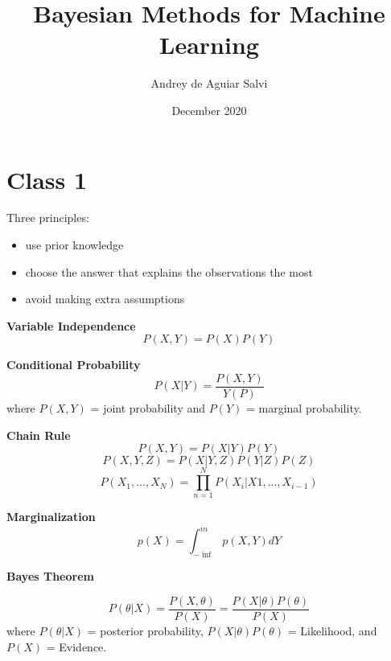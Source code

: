 \documentclass{article}
\title{Bayesian Methods for Machine Learning}
\author{Andrey de Aguiar Salvi}
\date{December 2020}
\begin{document}
\maketitle

\section{Class 1}
Three principles:
\begin{itemize}
    \item use prior knowledge
	\item choose the answer that explains the observations the most
    \item avoid making extra assumptions
\end{itemize}
		
\textbf{Variable Independence}
\begin{equation}
	P(X, Y) = P(X)P(Y)
\end{equation}
	
\textbf{Conditional Probability}
\begin{equation}
    P(X|Y) = \frac{P(X, Y)}{Y(P)}
\end{equation}
where $P(X, Y)$ = joint probability and $P(Y)$ = marginal probability.
		
\textbf{Chain Rule}
\begin{equation}
    P(X,Y) = P(X|Y)P(Y)
\end{equation}
\begin{equation}
	P(X, Y, Z) = P(X|Y, Z)P(Y|Z)P(Z)
\end{equation}
\begin{equation}
	P(X_1, ..., X_N) = \prod_{n=1}^{N} P(X_i|X1, ..., X_{i-1})
\end{equation}
		
\textbf{Marginalization}
\begin{equation}	
	p(X) = \int_{-\inf}^{in} p(X, Y)dY
\end{equation}
		
\textbf{Bayes Theorem}

\begin{equation}	
	P(\theta|X) = \frac{P(X, \theta)}{P(X)} = \frac{P(X|\theta)P(\theta)}{P(X)}
\end{equation}
where $P(\theta|X)$ = posterior probability, $P(X|\theta)P(\theta)$ = Likelihood, and $P(X)$ = Evidence.
\end{document}
